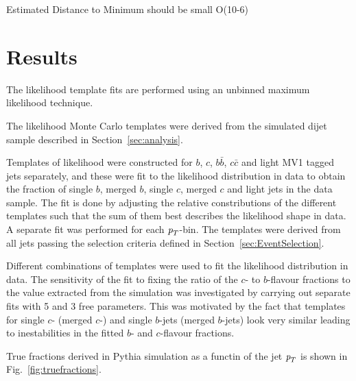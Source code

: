 Estimated Distance to Minimum
should be small O(10-6)
\section{Results}\label{sec:FitsResults}

The likelihood template fits are performed using an unbinned maximum likelihood technique.

The likelihood Monte Carlo templates were derived from the simulated dijet sample described in Section~\ref{sec:analysis}.

Templates of likelihood were constructed for $b$, $c$, $b\bar{b}$, $c\bar{c}$ and light MV1 tagged jets separately, and these were fit to the likelihood distribution in data to obtain the fraction of single $b$, merged $b$, single $c$, merged $c$ and light jets in the data sample.  The fit is done by adjusting the relative constributions of the different templates such that the sum of them best describes the likelihood shape in data. A separate fit was performed for each ${\emph{p}_{T}}$-bin.  The templates were derived from all jets passing the selection criteria defined in Section~\ref{sec:EventSelection}.


Different combinations of templates were used to fit the likelihood distribution in data. 
The sensitivity of the fit to fixing the ratio of the $c$- to $b$-flavour fractions to the value extracted from the simulation was investigated by carrying out separate fits with 5 and 3 free parameters. This was motivated by the fact that templates for single $c$- (merged $c$-)  and single $b$-jets (merged $b$-jets) look very similar leading to inestabilities in the fitted $b$- and $c$-flavour fractions.




True fractions derived in {\sc Pythia} simulation as a functin of the jet ${\emph{p}_{T}}$ is shown in Fig.~\ref{fig:truefractions}.


